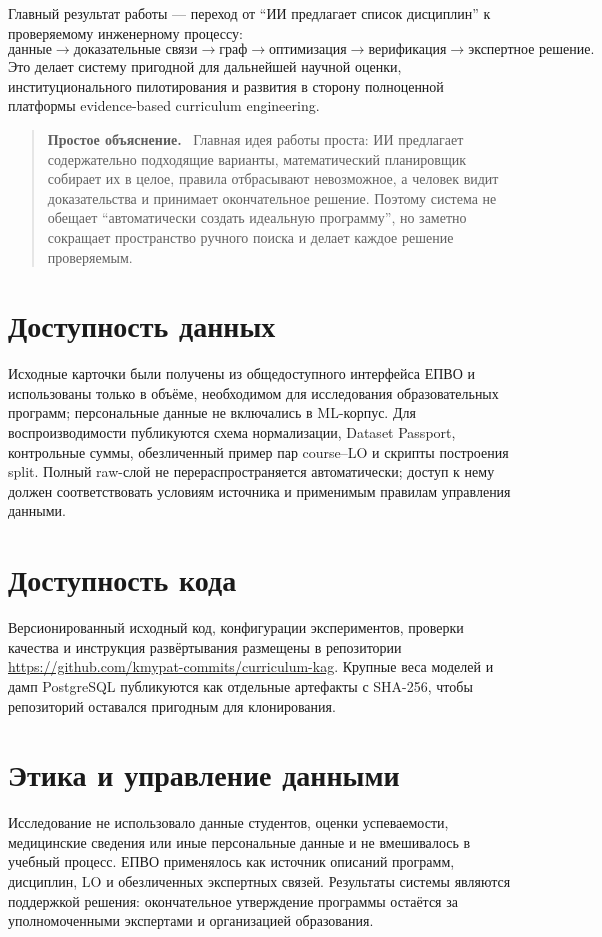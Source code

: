 \documentclass[twoside,11pt]{article}
\newenvironment{plainbox}{%
  \begin{quote}\small\noindent\textbf{Простое объяснение.}\ }{%
  \end{quote}}
\begin{document}
Главный результат работы --- переход от ``ИИ предлагает список дисциплин'' к проверяемому инженерному процессу:
\[
\text{данные}
\rightarrow
\text{доказательные связи}
\rightarrow
\text{граф}
\rightarrow
\text{оптимизация}
\rightarrow
\text{верификация}
\rightarrow
\text{экспертное решение}.
\]
Это делает систему пригодной для дальнейшей научной оценки, институционального пилотирования и развития в сторону полноценной платформы evidence-based curriculum engineering.

\begin{plainbox}
Главная идея работы проста: ИИ предлагает содержательно подходящие варианты,
математический планировщик собирает их в целое, правила отбрасывают невозможное,
а человек видит доказательства и принимает окончательное решение. Поэтому
система не обещает ``автоматически создать идеальную программу'', но заметно
сокращает пространство ручного поиска и делает каждое решение проверяемым.
\end{plainbox}

\section*{Доступность данных}
Исходные карточки были получены из общедоступного интерфейса ЕПВО и использованы только в объёме, необходимом для исследования образовательных программ; персональные данные не включались в ML-корпус. Для воспроизводимости публикуются схема нормализации, Dataset Passport, контрольные суммы, обезличенный пример пар course--LO и скрипты построения split. Полный raw-слой не перераспространяется автоматически; доступ к нему должен соответствовать условиям источника и применимым правилам управления данными.

\section*{Доступность кода}
Версионированный исходный код, конфигурации экспериментов, проверки качества и инструкция развёртывания размещены в репозитории \url{https://github.com/kmypat-commits/curriculum-kag}. Крупные веса моделей и дамп PostgreSQL публикуются как отдельные артефакты с SHA-256, чтобы репозиторий оставался пригодным для клонирования.

\section*{Этика и управление данными}
Исследование не использовало данные студентов, оценки успеваемости, медицинские сведения или иные персональные данные и не вмешивалось в учебный процесс. ЕПВО применялось как источник описаний программ, дисциплин, LO и обезличенных экспертных связей. Результаты системы являются поддержкой решения: окончательное утверждение программы остаётся за уполномоченными экспертами и организацией образования.
\end{document}
